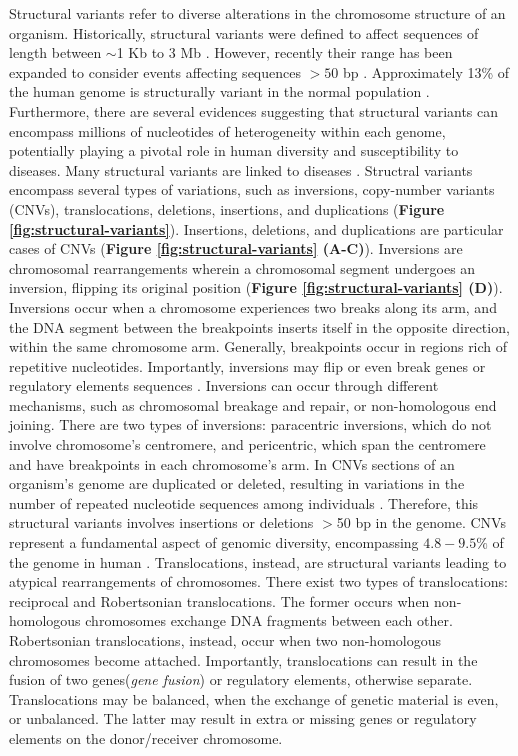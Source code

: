 \documentclass[a4paper, titlepage, openright]{book}
\begin{document}
Structural variants refer to diverse alterations in the chromosome structure of an organism. Historically, structural variants were defined to affect sequences of length between $\sim$1 Kb to 3 Mb \citep{feuk2006structural}. However, recently their range has been expanded to consider events affecting sequences $>50$ bp \citep{alkan2011genome}. Approximately 13\% of the human genome is structurally variant in the normal population \citep{sudmant2015integrated}. Furthermore, there are several evidences suggesting that structural variants can encompass millions of nucleotides of heterogeneity within each genome, potentially playing a pivotal role in human diversity and susceptibility to diseases. Many structural variants are linked to diseases \citep{lakich1993inversions}. Structral variants encompass several types of variations, such as inversions, copy-number variants (CNVs), translocations, deletions, insertions, and duplications (\textbf{Figure \ref{fig:structural-variants}}). Insertions, deletions, and duplications are particular cases of CNVs (\textbf{Figure \ref{fig:structural-variants} (A-C)}).  Inversions are chromosomal rearrangements wherein a chromosomal segment undergoes an inversion, flipping its original position (\textbf{Figure \ref{fig:structural-variants} (D)}). Inversions occur when a chromosome experiences two breaks along its arm, and the DNA segment between the breakpoints inserts itself in the opposite direction, within the same chromosome arm. Generally, breakpoints occur in regions rich of repetitive nucleotides. Importantly, inversions may flip or even break genes or regulatory elements sequences \citep{puig2015human}. Inversions can occur through different mechanisms, such as chromosomal breakage and repair, or non-homologous end joining. There are two types of inversions: paracentric inversions, which do not involve chromosome's centromere, and pericentric, which span the centromere and have breakpoints in each chromosome's arm. In CNVs sections of an organism's genome are duplicated or deleted, resulting in variations in the number of repeated nucleotide sequences among individuals \citep{mccarroll2007copy, alkan2011genome}. Therefore, this structural variants involves insertions or deletions $>$50 bp in the genome. CNVs represent a fundamental aspect of genomic diversity, encompassing $4.8-9.5\%$ of the genome in human \citep{zarrei2015copy}. Translocations, instead, are structural variants leading to atypical rearrangements of chromosomes. There exist two types of translocations: reciprocal and Robertsonian translocations. The former occurs when non-homologous chromosomes exchange DNA fragments between each other. Robertsonian translocations, instead, occur when two non-homologous chromosomes become attached. Importantly, translocations can result in the fusion of two genes(\emph{gene fusion}) or regulatory elements, otherwise separate. Translocations may be balanced, when the exchange of genetic material is even, or unbalanced. The latter may result in extra or missing genes or regulatory elements on the donor/receiver chromosome. 
\end{document}
